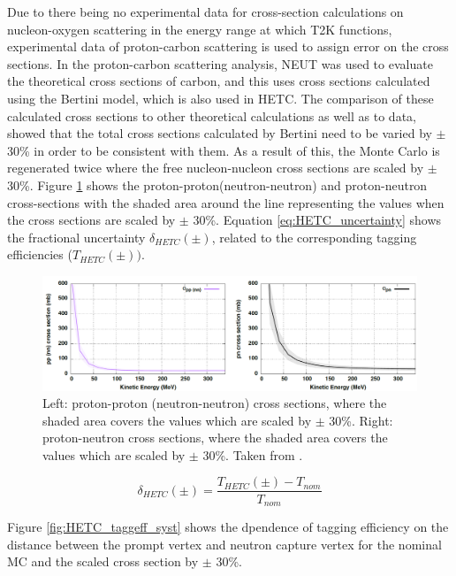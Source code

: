 Due to there being no experimental data for cross-section calculations on nucleon-oxygen scattering in the energy range at which T2K functions, experimental data of proton-carbon scattering is used to assign error on the cross sections. In the proton-carbon scattering analysis, NEUT was used to evaluate the theoretical cross sections of carbon, and this uses cross sections calculated using the Bertini model, which is also used in HETC. The comparison of these calculated cross sections to other theoretical calculations as well as to data, showed that the total cross sections calculated by Bertini need to be varied by $\pm$ 30\% in order to be consistent with them. As a result of this, the Monte Carlo is regenerated twice where the free nucleon-nucleon cross sections are scaled by $\pm$ 30\%. Figure \ref{fig:pp_nn_xsec} shows the proton-proton(neutron-neutron) and proton-neutron cross-sections with the shaded area around the line representing the values when the cross sections are scaled by $\pm$ 30\%. Equation \ref{eq:HETC_uncertainty} shows the fractional uncertainty $\delta_{HETC}(\pm)$, related to the corresponding tagging efficiencies ($T_{HETC}(\pm))$. 


\begin{figure}[!htb]
\centering
    \includegraphics[width=\textwidth]{Figures/pp_nn_xsec.PNG}
\caption{Left: proton-proton (neutron-neutron) cross sections, where the shaded area covers the values which are scaled by $\pm$ 30\%. Right: proton-neutron cross sections, where the shaded area covers the values which are scaled by $\pm$ 30\%. Taken from \cite{tn415_fiacob}.}
\label{fig:pp_nn_xsec}
\end{figure}



\begin{equation}
    \delta_{HETC }(\pm)=\frac{T_{HETC}(\pm)-T_{nom }}{T_{nom }}
\label{eq:HETC_uncertainty}
\end{equation}

Figure \ref{fig:HETC_taggeff_syst} shows the dpendence of tagging efficiency on the distance between the prompt vertex and neutron capture vertex for the nominal MC and the scaled cross section by $\pm$ 30\%. 



